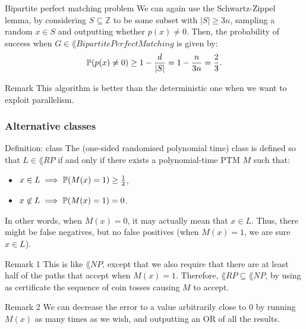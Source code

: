 \documentclass[a4paper]{article}
\begin{document}
\begin{parag}{Bipartite perfect matching problem}
    We can again use the Schwartz-Zippel lemma, by considering $S \subseteq \mathbb{Z}$ to be some subset with $\left|S\right| \geq 3n$, sampling a random $x \in S$ and outputting whether $p\left(x\right) \neq 0$. Then, the probability of success when $G \in \lang{BipartitePerfectMatching}$ is given by: 
    \[\prob\left(p\left(x\right) \neq 0\right) \geq 1 - \frac{d}{\left|S\right|} = 1 - \frac{n}{3n} = \frac{2}{3}.\]
    


    \begin{subparag}{Remark}
        This algorithm is better than the deterministic one when we want to exploit parallelism.
    \end{subparag}
\end{parag}

\subsubsection{Alternative classes}

\begin{parag}{Definition:  class}
    The  (one-sided randomised polynomial time) class is defined so that $L \in \lang{RP}$ if and only if there exists a polynomial-time PTM $M$ such that:
    \begin{itemize}
        \item $x \in L \implies \prob\left(M\left(x\right) = 1\right) \geq \frac{1}{2}$,
        \item $x \not \in L \implies \prob\left(M\left(x\right) = 1\right) = 0$.
    \end{itemize}

    In other words, when $M\left(x\right) = 0$, it may actually mean that $x \in L$. Thus, there might be false negatives, but no false positives (when $M\left(x\right) = 1$, we are sure $x \in L$).

    \begin{subparag}{Remark 1}
        This is like $\lang{NP}$, except that we also require that there are at least half of the paths that accept when $M\left(x\right) = 1$. Therefore, $\lang{RP} \subseteq \lang{NP}$, by using as certificate the sequence of coin tosses causing $M$ to accept.
    \end{subparag}

    \begin{subparag}{Remark 2}
        We can decrease the error to a value arbitrarily close to $0$ by running $M\left(x\right)$ as many times as we wish, and outputting an OR of all the results.
    \end{subparag}
\end{parag}
\end{document}
